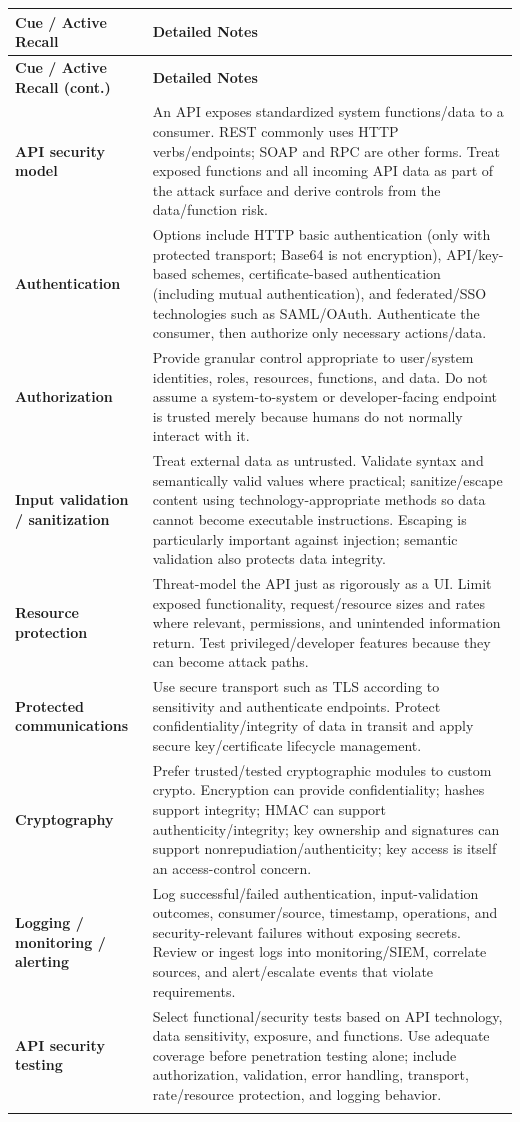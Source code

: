 \documentclass[10pt,letterpaper]{article}
\makeatletter
\newenvironment{cornell}{\rowcolors{2}{white}{notebg}\begin{longtable}{@{}>{\raggedright\arraybackslash\columncolor{cuebg}\color{navy}\bfseries}p{0.285\textwidth}>{\raggedright\arraybackslash}p{0.65\textwidth}@{}}\rowcolor{navy}\color{white}\textbf{Cue / Active Recall} & \color{white}\textbf{Detailed Notes}\\ \hline\endfirsthead\rowcolor{navy}\color{white}\textbf{Cue / Active Recall (cont.)} & \color{white}\textbf{Detailed Notes}\\ \hline\endhead}{\end{longtable}}
\newcommand{\noterow}[2]{#1 & #2\\\arrayrulecolor{line}\hline}\newcommand{\source}[1]{\par{\footnotesize\color{teal}\textit{Source: CBK, #1}}\par}
\makeatother
\begin{document}
\begin{cornell}
\noterow{API security model}{An API exposes standardized system functions/data to a consumer. REST commonly uses HTTP verbs/endpoints; SOAP and RPC are other forms. Treat exposed functions and all incoming API data as part of the attack surface and derive controls from the data/function risk.}
\noterow{Authentication}{Options include HTTP basic authentication (only with protected transport; Base64 is not encryption), API/key-based schemes, certificate-based authentication (including mutual authentication), and federated/SSO technologies such as SAML/OAuth. Authenticate the consumer, then authorize only necessary actions/data.}
\noterow{Authorization}{Provide granular control appropriate to user/system identities, roles, resources, functions, and data. Do not assume a system-to-system or developer-facing endpoint is trusted merely because humans do not normally interact with it.}
\noterow{Input validation / sanitization}{Treat external data as untrusted. Validate syntax and semantically valid values where practical; sanitize/escape content using technology-appropriate methods so data cannot become executable instructions. Escaping is particularly important against injection; semantic validation also protects data integrity.}
\noterow{Resource protection}{Threat-model the API just as rigorously as a UI. Limit exposed functionality, request/resource sizes and rates where relevant, permissions, and unintended information return. Test privileged/developer features because they can become attack paths.}
\noterow{Protected communications}{Use secure transport such as TLS according to sensitivity and authenticate endpoints. Protect confidentiality/integrity of data in transit and apply secure key/certificate lifecycle management.}
\noterow{Cryptography}{Prefer trusted/tested cryptographic modules to custom crypto. Encryption can provide confidentiality; hashes support integrity; HMAC can support authenticity/integrity; key ownership and signatures can support nonrepudiation/authenticity; key access is itself an access-control concern.}
\noterow{Logging / monitoring / alerting}{Log successful/failed authentication, input-validation outcomes, consumer/source, timestamp, operations, and security-relevant failures without exposing secrets. Review or ingest logs into monitoring/SIEM, correlate sources, and alert/escalate events that violate requirements.}
\noterow{API security testing}{Select functional/security tests based on API technology, data sensitivity, exposure, and functions. Use adequate coverage before penetration testing alone; include authorization, validation, error handling, transport, rate/resource protection, and logging behavior.}
\end{cornell}
\end{document}
